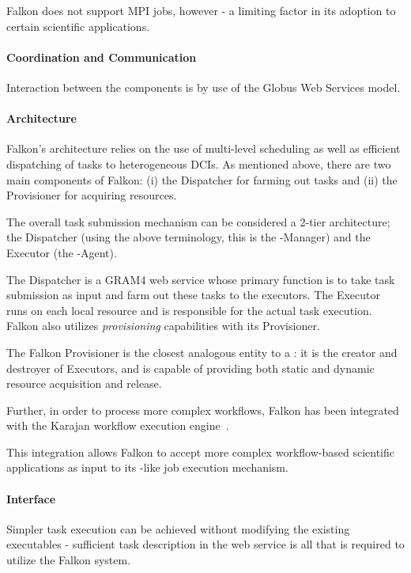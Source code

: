 \documentclass{sig-alternate}
\begin{document}
Falkon does not support MPI jobs, however - a limiting factor in its adoption
to certain scientific applications.

\paragraph{Coordination and Communication}

Interaction between the components is by use of the Globus Web Services model.

\paragraph{Architecture}

Falkon's architecture relies on the use of multi-level scheduling
as well as efficient dispatching of tasks to heterogeneous DCIs.
As mentioned above, there are two main components of Falkon:
(i) the Dispatcher for farming out tasks and
(ii) the Provisioner for acquiring resources.

The overall task submission mechanism can be considered
a 2-tier architecture; the Dispatcher (using the above terminology,
this is the \pilot-Manager) and the Executor (the \pilot-Agent).

The Dispatcher is a GRAM4 web service whose primary
function is to take task submission as input and farm
out these tasks to the executors. The Executor runs on
each local resource and is responsible for the actual
task execution. Falkon also utilizes \textit{provisioning}
capabilities with its Provisioner.

The Falkon Provisioner is the closest analogous entity to a \pilot: it is the
creator and destroyer of Executors, and is capable of providing both static and
dynamic resource acquisition and release.

Further, in order to process more complex workflows, Falkon has been integrated
with the Karajan workflow execution engine~\cite{karajan}.

This integration allows Falkon to accept more complex workflow-based scientific
applications as input to its \pilot-like job execution mechanism.

\paragraph{Interface}

Simpler task execution can be achieved without modifying the existing
executables - sufficient task description in the web service is all that is
required to utilize the Falkon system.
\end{document}
